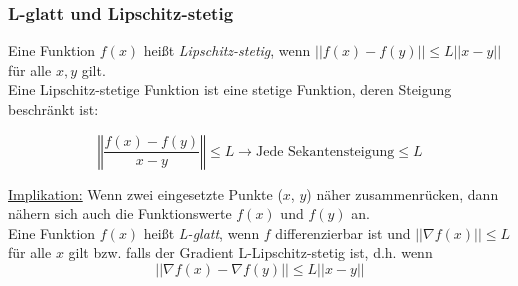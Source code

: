 \subsubsection{L-glatt und Lipschitz-stetig}

Eine Funktion \(f(x)\) heißt \emph{Lipschitz-stetig}, wenn \(||f(x) - f(y)|| \leq L ||x - y||\) für alle \(x, y\) gilt.\\

Eine Lipschitz-stetige Funktion ist eine stetige Funktion, deren Steigung beschränkt ist:

\begin{equation*}
    \left\Vert\frac{f(x)-f(y)}{x-y}\right\Vert \leq L \rightarrow \text{Jede Sekantensteigung} \leq L
\end{equation*}

\underline{Implikation:} Wenn zwei eingesetzte Punkte (\(x\), \(y\)) näher zusammenrücken, dann nähern sich auch die Funktionswerte \(f(x)\) und \(f(y)\) an.\\


Eine Funktion \(f(x)\) heißt \emph{L-glatt}, wenn \(f\) differenzierbar ist und \(||\nabla f(x)|| \leq L\) für alle \(x\) gilt bzw. falls der Gradient L-Lipschitz-stetig ist, d.h. wenn
\begin{equation*}
    ||\nabla f(x) - \nabla f(y)|| \leq L||x-y||
\end{equation*}
